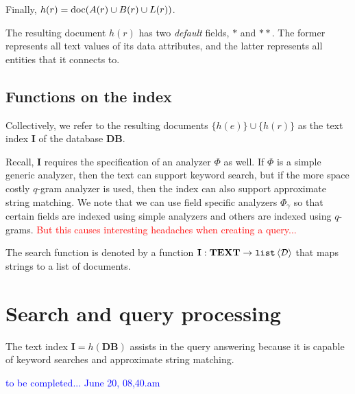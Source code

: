 \documentclass{article}
\begin{document}
Finally, $h(r) = \operatorname{doc}(A(r)\cup B(r)\cup L(r))$.

The resulting document $h(r)$ has two {\em default} fields, $*$ and $**$.  The
former represents all text values of its data attributes, and the latter
represents all entities that it connects to.

\subsection{Functions on the index}

Collectively, we refer to the resulting documents $\{h(e)\}\cup\{h(r)\}$ as the
text index $\textbf{I}$ of the database $\textbf{DB}$.

Recall, $\textbf{I}$ requires the specification of an analyzer $\Phi$ as well.
If $\Phi$ is a simple generic analyzer, then the text can support keyword
search, but if the more space costly $q$-gram analyzer is used, then the index
can also support approximate string matching.  We note that we can use field
specific analyzers $\Phi_\gamma$ so that certain fields are indexed using simple
analyzers and others are indexed using $q$-grams.  \textcolor{red}{But this
causes interesting headaches when creating a query...}

The search function is denoted by a function
$\mathbf{I}:\mathbf{TEXT}\to\mathtt{list}\left<\mathcal{D}\right>$ that maps strings to a list of
documents.

\section{Search and query processing}

The text index $\mathbf{I} = h(\mathbf{DB})$ assists in the query answering
because it is capable of keyword searches and approximate string matching.

\textcolor{blue}{to be completed... June 20, 08,40.am}
\end{document}
